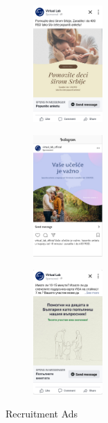 \message{ !name(bebbo.tex)}\documentclass{article}
\begin{document}
\begin{figure}[h]
\centering
\begin{subfigure}{0.3\textwidth}
\centering
\includegraphics[width=100px]{images/recruitment/558.png}
\end{subfigure}
\begin{subfigure}{0.3\textwidth}
\centering
\includegraphics[width=100px]{images/recruitment/639.png}
\end{subfigure}
\begin{subfigure}{0.3\textwidth}
\centering
\includegraphics[width=100px]{images/recruitment/742.png}
\end{subfigure}
\caption{Recruitment Ads}
\label{fig:Recruitment Ads}
\end{figure}




\end{document}
